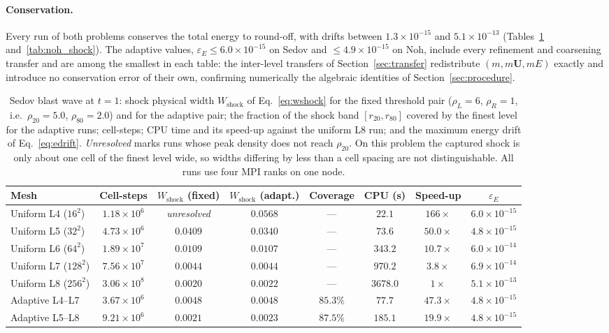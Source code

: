 \documentclass[a4paper]{cas-sc}
\begin{document}
\paragraph{Conservation.}
\label{sec:numerics_conservation}
Every run of both problems conserves the total energy to round-off, with
drifts between $1.3\times10^{-15}$ and $5.1\times10^{-13}$
(Tables~\ref{tab:sedov_shock} and~\ref{tab:noh_shock}). The adaptive values,
$\varepsilon_E\le6.0\times10^{-15}$ on Sedov and $\le4.9\times10^{-15}$ on
Noh, include every refinement and coarsening transfer and are among the
smallest in each table: the inter-level transfers of
Section~\ref{sec:transfer} redistribute $(m,m\boldsymbol U,mE)$ exactly and
introduce no conservation error of their own, confirming numerically the
algebraic identities of Section~\ref{sec:procedure}.

\begin{table}[pos=htbp]
	\centering
	\caption{Sedov blast wave at $t=1$: shock physical width
	$W_{\mathrm{shock}}$ of Eq.~\eqref{eq:wshock} for the fixed threshold pair
	($\rho_L=6$, $\rho_R=1$, i.e.\ $\rho_{20}=5.0$, $\rho_{80}=2.0$) and for
	the adaptive pair; the fraction of the shock band $[r_{20},r_{80}]$
	covered by the finest level for the adaptive runs; cell-steps; CPU time
	and its speed-up against the uniform L8 run; and the maximum energy drift
	of Eq.~\eqref{eq:edrift}. \emph{Unresolved} marks runs whose peak density
	does not reach $\rho_{20}$. On this problem the captured shock is only
	about one cell of the finest level wide, so widths differing by less than
	a cell spacing are not distinguishable. All runs use four MPI ranks on
	one node.}
	\label{tab:sedov_shock}
	\begin{tabular}{lccccccc}
		\hline
		Mesh & Cell-steps & $W_{\mathrm{shock}}$ (fixed) & $W_{\mathrm{shock}}$ (adapt.) & Coverage & CPU (s) & Speed-up & $\varepsilon_E$ \\
		\hline
		Uniform L4 ($16^2$)  & $1.18\times10^{6}$ & \emph{unresolved} & $0.0568$ & ---      & $22.1$   & $166\times$  & $6.0\times10^{-15}$ \\
		Uniform L5 ($32^2$)  & $4.73\times10^{6}$ & $0.0409$          & $0.0340$ & ---      & $73.6$   & $50.0\times$ & $4.8\times10^{-15}$ \\
		Uniform L6 ($64^2$)  & $1.89\times10^{7}$ & $0.0109$          & $0.0107$ & ---      & $343.2$  & $10.7\times$ & $6.0\times10^{-14}$ \\
		Uniform L7 ($128^2$) & $7.56\times10^{7}$ & $0.0044$          & $0.0044$ & ---      & $970.2$  & $3.8\times$  & $6.9\times10^{-14}$ \\
		Uniform L8 ($256^2$) & $3.06\times10^{8}$ & $0.0020$          & $0.0022$ & ---      & $3678.0$ & $1\times$    & $5.1\times10^{-13}$ \\
		Adaptive L4--L7      & $3.67\times10^{6}$ & $0.0048$          & $0.0048$ & $85.3\%$ & $77.7$   & $47.3\times$ & $4.8\times10^{-15}$ \\
		Adaptive L5--L8      & $9.21\times10^{6}$ & $0.0021$          & $0.0023$ & $87.5\%$ & $185.1$  & $19.9\times$ & $4.8\times10^{-15}$ \\
		\hline
	\end{tabular}
\end{table}
\end{document}
